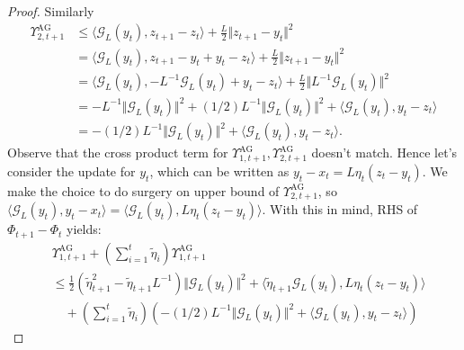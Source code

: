 \documentclass[12pt]{article}
\begin{document}
\begin{proof}
        Similarly 
        \begin{align*}
            \Upsilon_{2, t + 1}^{\text{AG}} 
            &\le 
            \langle \mathcal G_L(y_t), z_{t + 1} - z_t\rangle + 
            \frac{L}{2}\Vert z_{t + 1} - y_t\Vert^2
            \\
            &= 
            \langle \mathcal G_L(y_t), z_{t + 1} - y_t + y_t - z_t\rangle
            + \frac{L}{2}\Vert z_{t + 1} - y_t\Vert^2
            \\
            &= 
            \langle \mathcal G_L(y_t), - L^{-1} \mathcal G_L(y_t) + y_t - z_t\rangle
            + 
            \frac{L}{2}\Vert L^{-1}\mathcal G_L(y_t)\Vert^2
            \\
            &= 
            -L^{-1}\Vert \mathcal G_L(y_t)\Vert^2 
            + 
            (1/2)L^{-1}\Vert \mathcal G_L(y_t)\Vert^2 
            + 
            \langle \mathcal G_L(y_t), y_t - z_t\rangle
            \\
            &= 
            -(1/2)L^{-1}\Vert \mathcal G_L(y_t)\Vert^2
            + 
            \langle \mathcal G_L(y_t), y_t - z_t\rangle. 
        \end{align*}
        Observe that the cross product term for $\Upsilon_{1, t + 1}^\text{AG}, \Upsilon_{2, t + 1}^\text{AG}$ doesn't match. 
        Hence let's consider the update for $y_t$, which can be written as $y_t - x_t = L \eta_t (z_t - y_t)$. We make the choice to do surgery on upper bound of $\Upsilon_{2, t + 1}^\text{AG}$, so $\langle \mathcal G_L(y_t), y_t - x_t\rangle = \langle \mathcal G_L(y_t), L \eta_t (z_t - y_t)\rangle$. 
        With this in mind, RHS of $\Phi_{t + 1} - \Phi_t$ yields: 
        {\footnotesize
        \begin{align*}
            &\Upsilon_{1, t + 1}^\text{AG} + 
            \left(
                \sum_{i = 1}^{t}\tilde\eta_i 
            \right)\Upsilon_{1, t + 1}^{\text{AG}}
            \\
            &\le 
            \frac{1}{2}\left(
                \tilde\eta_{t + 1}^2 - \tilde\eta_{t + 1}L^{-1}
            \right)\Vert \mathcal G_L(y_t)\Vert^2 
            + 
            \langle \tilde\eta_{t + 1} \mathcal G_L(y_t), L\eta_t(z_t - y_t)\rangle
            \\ 
            &\quad 
            + 
            \left(
                \sum_{i = 1}^{t}\tilde\eta_i 
            \right)\left(
                -(1/2)L^{-1}\Vert \mathcal G_L(y_t)\Vert^2
                + 
                \langle \mathcal G_L(y_t), y_t - z_t\rangle
            \right)

\end{align*}}
\end{proof}
\end{document}
